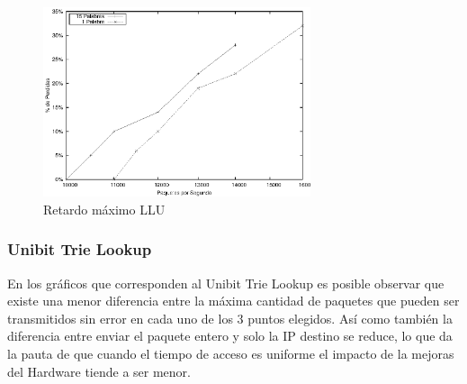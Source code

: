 \begin{figure}[!h]
  \centering
	\includegraphics[width=0.7\textwidth]{5-resultados/graf/llumax.eps}
  \caption{Retardo máximo LLU}
  \label{figmaxllu}
\end{figure}



\newpage

\subsubsection{Unibit Trie Lookup}

En los gráficos que corresponden al Unibit Trie Lookup es posible observar que existe una menor diferencia entre la máxima cantidad de paquetes que pueden ser transmitidos sin error en cada uno de los 3 puntos elegidos. Así como también la diferencia entre enviar el paquete entero y solo la IP destino se reduce, lo que da la pauta de que cuando el tiempo de acceso es uniforme el impacto de la mejoras del Hardware tiende a ser menor.

